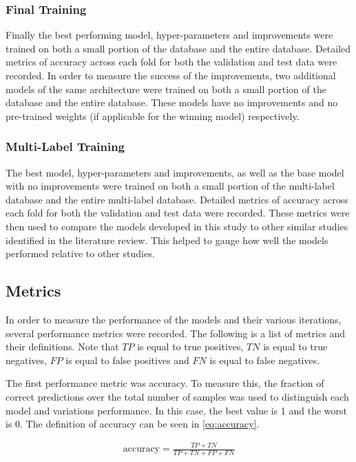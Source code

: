 \subsubsection{Final Training}
Finally the best performing model, hyper-parameters and improvements were trained on both a small portion of the database and the entire database. Detailed metrics of accuracy across each fold for both the validation and test data were recorded. In order to measure the success of the improvements, two additional models of the same architecture were trained on both a small portion of the database and the entire database. These models have no improvements and no pre-trained weights (if applicable for the winning model) respectively.

\subsubsection{Multi-Label Training}
The best model, hyper-parameters and improvements, as well as the base model with no improvements were trained on both a small portion of the multi-label database and the entire multi-label database. Detailed metrics of accuracy across each fold for both the validation and test data were recorded. These metrics were then used to compare the models developed in this study to other similar studies identified in the literature review. This helped to gauge how well the models performed relative to other studies.

\subsection{Metrics}
In order to measure the performance of the models and their various iterations, several performance metrics were recorded. The following is a list of metrics and their definitions. Note that $TP$ is equal to true positives, $TN$ is equal to true negatives, $FP$ is equal to false positives and $FN$ is equal to false negatives.

The first performance metric was accuracy. To measure this, the fraction of correct predictions over the total number of samples was used to distinguish each model and variations performance. In this case, the best value is 1 and the worst is 0. The definition of accuracy can be seen in \autoref{eq:accuracy}.

\begin{align}
\text{accuracy}= \frac{TP+TN}{TP+TN+FP+FN}
\label{eq:accuracy}
\end{align}

